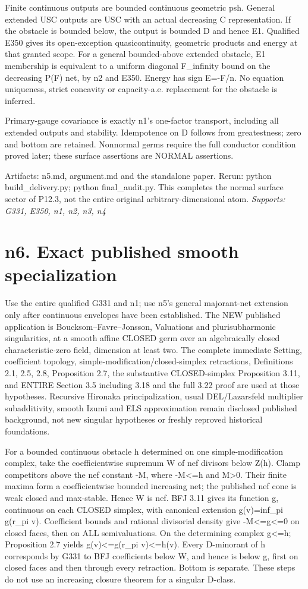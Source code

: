 \documentclass[11pt]{article}
\begin{document}
Finite continuous outputs are bounded continuous geometric psh. General extended USC outputs are USC with an actual decreasing C representation. If the obstacle is bounded below, the output is bounded D and hence E1. Qualified E350 gives its open-exception quasicontinuity, geometric products and energy at that granted scope. For a general bounded-above extended obstacle, E1 membership is equivalent to a uniform diagonal F\_infinity bound on the decreasing P(F) net, by n2 and E350. Energy has sign E=-F/n. No equation uniqueness, strict concavity or capacity-a.e. replacement for the obstacle is inferred.

Primary-gauge covariance is exactly n1's one-factor transport, including all extended outputs and stability. Idempotence on D follows from greatestness; zero and bottom are retained. Nonnormal germs require the full conductor condition proved later; these surface assertions are NORMAL assertions.

Artifacts: n5.md, argument.md and the standalone paper. Rerun: python build\_delivery.py; python final\_audit.py. This completes the normal surface sector of P12.3, not the entire original arbitrary-dimensional atom.
\textit{Supports: G331, E350, n1, n2, n3, n4}

\section{n6. Exact published smooth specialization}

Use the entire qualified G331 and n1; use n5's general majorant-net extension only after continuous envelopes have been established. The NEW published application is Boucksom--Favre--Jonsson, Valuations and plurisubharmonic singularities, at a smooth affine CLOSED germ over an algebraically closed characteristic-zero field, dimension at least two. The complete immediate Setting, coefficient topology, simple-modification/closed-simplex retractions, Definitions 2.1, 2.5, 2.8, Proposition 2.7, the substantive CLOSED-simplex Proposition 3.11, and ENTIRE Section 3.5 including 3.18 and the full 3.22 proof are used at those hypotheses. Recursive Hironaka principalization, usual DEL/Lazarsfeld multiplier subadditivity, smooth Izumi and ELS approximation remain disclosed published background, not new singular hypotheses or freshly reproved historical foundations.

For a bounded continuous obstacle h determined on one simple-modification complex, take the coefficientwise supremum W of nef divisors below Z(h). Clamp competitors above the nef constant -M, where -M<=h and M>0. Their finite maxima form a coefficientwise bounded increasing net; the published nef cone is weak closed and max-stable. Hence W is nef. BFJ 3.11 gives its function g, continuous on each CLOSED simplex, with canonical extension g(v)=inf\_pi g(r\_pi v). Coefficient bounds and rational divisorial density give -M<=g<=0 on closed faces, then on ALL semivaluations. On the determining complex g<=h; Proposition 2.7 yields g(v)<=g(r\_pi v)<=h(v). Every D-minorant of h corresponds by G331 to BFJ coefficients below W, and hence is below g, first on closed faces and then through every retraction. Bottom is separate. These steps do not use an increasing closure theorem for a singular D-class.
\end{document}
